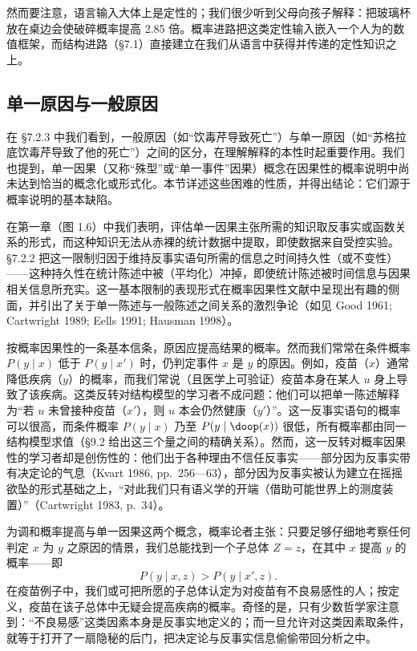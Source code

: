 然而要注意，语言输入大体上是定性的；我们很少听到父母向孩子解释：把玻璃杯放在桌边会使破碎概率提高 2.85 倍。概率进路把这类定性输入嵌入一个人为的数值框架，而结构进路（\S 7.1）直接建立在我们从语言中获得并传递的定性知识之上。

\subsection{单一原因与一般原因}

在 \S 7.2.3 中我们看到，一般原因（如“饮毒芹导致死亡”）与单一原因（如“苏格拉底饮毒芹导致了他的死亡”）之间的区分，在理解解释的本性时起重要作用。我们也提到，单一因果（又称“殊型”或“单一事件”因果）概念在因果性的概率说明中尚未达到恰当的概念化或形式化。本节详述这些困难的性质，并得出结论：它们源于概率说明的基本缺陷。

在第一章（图 1.6）中我们表明，评估单一因果主张所需的知识取反事实或函数关系的形式，而这种知识无法从赤裸的统计数据中提取，即使数据来自受控实验。\S 7.2.2 把这一限制归因于维持反事实语句所需的信息之时间持久性（或不变性）——这种持久性在统计陈述中被（平均化）冲掉，即使统计陈述被时间信息与因果相关信息所充实。这一基本限制的表现形式在概率因果性文献中呈现出有趣的侧面，并引出了关于单一陈述与一般陈述之间关系的激烈争论（如见 Good 1961; Cartwright 1989; Eells 1991; Hausman 1998）。

按概率因果性的一条基本信条，原因应提高结果的概率。然而我们常常在条件概率 $P(y\mid x)$ 低于 $P(y\mid x')$ 时，仍判定事件 $x$ 是 $y$ 的原因。例如，疫苗（$x$）通常降低疾病（$y$）的概率，而我们常说（且医学上可验证）疫苗本身在某人 $u$ 身上导致了该疾病。这类反转对结构模型的学习者不成问题：他们可以把单一陈述解释为“若 $u$ 未曾接种疫苗（$x'$），则 $u$ 本会仍然健康（$y'$）”。这一反事实语句的概率可以很高，而条件概率 $P(y\mid x)$ 乃至 $P(y\mid\doop(x))$ 很低，所有概率都由同一结构模型求值（\S 9.2 给出这三个量之间的精确关系）。然而，这一反转对概率因果性的学习者却是创伤性的：他们出于各种理由不信任反事实——部分因为反事实带有决定论的气息（Kvart 1986, pp.~256—63），部分因为反事实被认为建立在摇摇欲坠的形式基础之上，“对此我们只有语义学的开端（借助可能世界上的测度装置）”（Cartwright 1983, p.~34）。

为调和概率提高与单一因果这两个概念，概率论者主张：只要足够仔细地考察任何判定 $x$ 为 $y$ 之原因的情景，我们总能找到一个子总体 $Z=z$，在其中 $x$ 提高 $y$ 的概率——即
\begin{equation}
P(y\mid x,z)>P(y\mid x',z). \tag{7.47}
\end{equation}
在疫苗例子中，我们或可把所愿的子总体认定为对疫苗有不良易感性的人；按定义，疫苗在该子总体中无疑会提高疾病的概率。奇怪的是，只有少数哲学家注意到：“不良易感”这类因素本身是反事实地定义的；而一旦允许对这类因素取条件，就等于打开了一扇隐秘的后门，把决定论与反事实信息偷偷带回分析之中。

